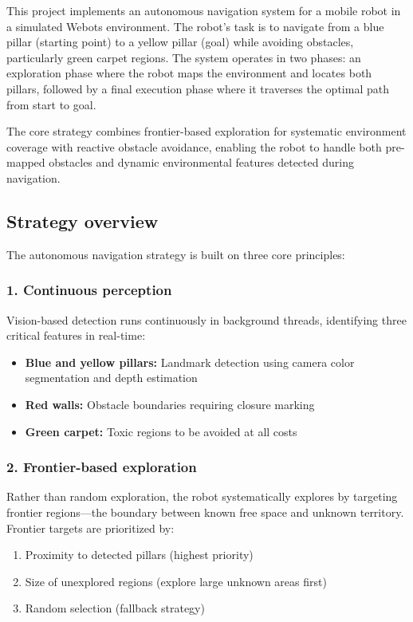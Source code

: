 \documentclass{article}
\begin{document}
This project implements an autonomous navigation system for a mobile robot in a simulated Webots environment. The robot's task is to navigate from a blue pillar (starting point) to a yellow pillar (goal) while avoiding obstacles, particularly green carpet regions. The system operates in two phases: an exploration phase where the robot maps the environment and locates both pillars, followed by a final execution phase where it traverses the optimal path from start to goal.

The core strategy combines frontier-based exploration for systematic environment coverage with reactive obstacle avoidance, enabling the robot to handle both pre-mapped obstacles and dynamic environmental features detected during navigation.

\subsection{Strategy overview}

The autonomous navigation strategy is built on three core principles:

\subsubsection*{1. Continuous perception}
Vision-based detection runs continuously in background threads, identifying three critical features in real-time:
\begin{itemize}
    \item \textbf{Blue and yellow pillars:} Landmark detection using camera color segmentation and depth estimation
    \item \textbf{Red walls:} Obstacle boundaries requiring closure marking
    \item \textbf{Green carpet:} Toxic regions to be avoided at all costs
\end{itemize}

\subsubsection*{2. Frontier-based exploration}
Rather than random exploration, the robot systematically explores by targeting frontier regions—the boundary between known free space and unknown territory. Frontier targets are prioritized by:
\begin{enumerate}
    \item Proximity to detected pillars (highest priority)
    \item Size of unexplored regions (explore large unknown areas first)
    \item Random selection (fallback strategy)
\end{enumerate}
\end{document}
